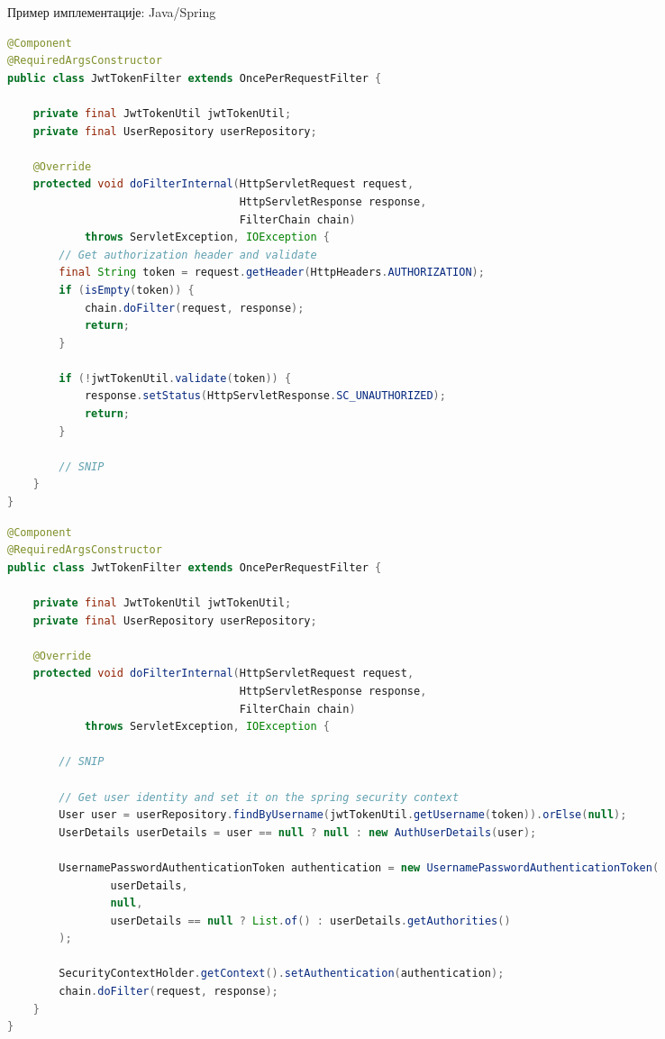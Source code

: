 \documentclass{beamer}
\begin{document}
    \begin{frame}{Пример имплементације: Java/Spring}
        \begin{adjustbox}{width=\textwidth,height=0.7\textheight,keepaspectratio}
			\begin{lstlisting}[language=java]
@Component
@RequiredArgsConstructor
public class JwtTokenFilter extends OncePerRequestFilter {

    private final JwtTokenUtil jwtTokenUtil;
    private final UserRepository userRepository;

    @Override
    protected void doFilterInternal(HttpServletRequest request,
                                    HttpServletResponse response,
                                    FilterChain chain)
            throws ServletException, IOException {
        // Get authorization header and validate
        final String token = request.getHeader(HttpHeaders.AUTHORIZATION);
        if (isEmpty(token)) {
            chain.doFilter(request, response);
            return;
        }

        if (!jwtTokenUtil.validate(token)) {
            response.setStatus(HttpServletResponse.SC_UNAUTHORIZED);
            return;
        }

        // SNIP
    }
}
			\end{lstlisting}
		\end{adjustbox}
		
		\framebreak
		
		\begin{adjustbox}{width=\textwidth,height=0.7\textheight,keepaspectratio}
			\begin{lstlisting}[language=java]
@Component
@RequiredArgsConstructor
public class JwtTokenFilter extends OncePerRequestFilter {

    private final JwtTokenUtil jwtTokenUtil;
    private final UserRepository userRepository;

    @Override
    protected void doFilterInternal(HttpServletRequest request,
                                    HttpServletResponse response,
                                    FilterChain chain)
            throws ServletException, IOException {

        // SNIP
        
        // Get user identity and set it on the spring security context
        User user = userRepository.findByUsername(jwtTokenUtil.getUsername(token)).orElse(null);
        UserDetails userDetails = user == null ? null : new AuthUserDetails(user);

        UsernamePasswordAuthenticationToken authentication = new UsernamePasswordAuthenticationToken(
                userDetails,
                null,
                userDetails == null ? List.of() : userDetails.getAuthorities()
        );

        SecurityContextHolder.getContext().setAuthentication(authentication);
        chain.doFilter(request, response);
    }
}
			\end{lstlisting}
		\end{adjustbox}
    \end{frame}
    
\end{document}
